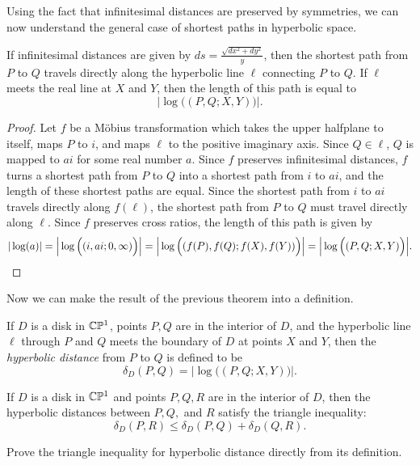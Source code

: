 Using the fact that infinitesimal distances are preserved by symmetries, we can now understand the general case of shortest paths in hyperbolic space.

\begin{thm} If infinitesimal distances are given by $ds = \frac{\sqrt{dx^2 + dy^2}}{y}$, then the shortest path from $P$ to $Q$ travels directly along the hyperbolic line $\ell$ connecting $P$ to $Q$. If $\ell$ meets the real line at $X$ and $Y$, then the length of this path is equal to
\[
\Big|\log\Big((P,Q;X,Y)\Big)\Big|.
\]
\end{thm}
\begin{proof} Let $f$ be a M\"obius transformation which takes the upper halfplane to itself, maps $P$ to $i$, and maps $\ell$ to the positive imaginary axis. Since $Q \in \ell$, $Q$ is mapped to $ai$ for some real number $a$. Since $f$ preserves infinitesimal distances, $f$ turns a shortest path from $P$ to $Q$ into a shortest path from $i$ to $ai$, and the length of these shortest paths are equal. Since the shortest path from $i$ to $ai$ travels directly along $f(\ell)$, the shortest path from $P$ to $Q$ must travel directly along $\ell$. Since $f$ preserves cross ratios, the length of this path is given by
\[
|\log(a)| = \Big|\log\Big((i,ai;0,\infty)\Big)\Big| = \Big|\log\Big((f(P),f(Q);f(X),f(Y))\Big)\Big| = \Big|\log\Big((P,Q;X,Y)\Big)\Big|.\qedhere
\]
\end{proof}

Now we can make the result of the previous theorem into a definition.

\begin{defn} If $D$ is a disk in $\mathbb{C}\mathbb{P}^1$, points $P,Q$ are in the interior of $D$, and the hyperbolic line $\ell$ through $P$ and $Q$ meets the boundary of $D$ at points $X$ and $Y$, then the \emph{hyperbolic distance} from $P$ to $Q$ is defined to be
\[
\delta_D(P,Q) = \Big|\log\Big((P,Q;X,Y)\Big)\Big|.
\]
\end{defn}

\begin{cor} If $D$ is a disk in $\mathbb{C}\mathbb{P}^1$ and points $P,Q,R$ are in the interior of $D$, then the hyperbolic distances between $P,Q,$ and $R$ satisfy the triangle inequality:
\[
\delta_D(P,R) \le \delta_D(P,Q) + \delta_D(Q,R).
\]
\end{cor}

\begin{exer} Prove the triangle inequality for hyperbolic distance directly from its definition.
\end{exer}

